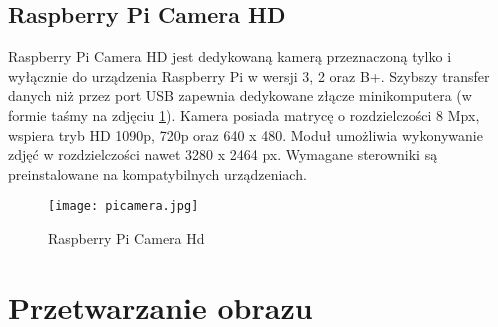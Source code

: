 \subsection{Raspberry Pi Camera HD}
Raspberry Pi Camera HD jest dedykowaną kamerą przeznaczoną tylko i wyłącznie do urządzenia Raspberry Pi w wersji 3, 2 oraz B+. Szybszy transfer danych niż przez port USB zapewnia dedykowane złącze minikomputera (w formie taśmy na zdjęciu \ref{fig:picamera}). Kamera posiada matrycę o rozdzielczości 8 Mpx, wspiera tryb HD 1090p, 720p oraz 640 x 480. Moduł umożliwia wykonywanie zdjęć w rozdzielczości nawet 3280 x 2464 px. Wymagane sterowniki są preinstalowane na kompatybilnych urządzeniach.
\begin{figure}[H]
	\centering
	\texttt{[image: picamera.jpg]}
	\caption{Raspberry Pi Camera Hd}
	\label{fig:picamera}
\end{figure}

\section{Przetwarzanie obrazu}
